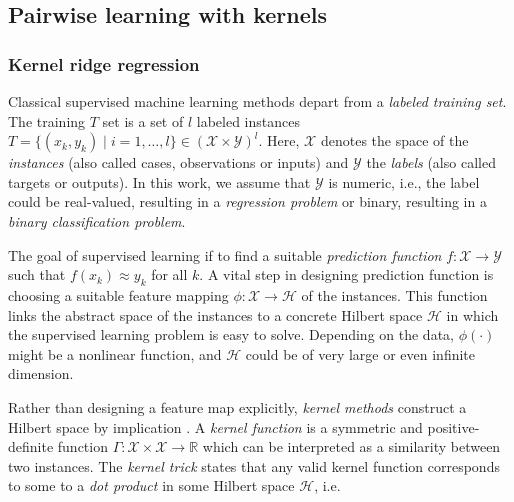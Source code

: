 \documentclass[
]{article}
\begin{document}
\hypertarget{pairwise-learning-with-kernels}{%
\subsection{Pairwise learning with
kernels}\label{pairwise-learning-with-kernels}}

\hypertarget{kernel-ridge-regression}{%
\subsubsection{Kernel ridge regression}\label{kernel-ridge-regression}}

Classical supervised machine learning methods depart from a
\emph{labeled training set}. The training \(T\) set is a set of \(l\)
labeled instances
\(T = \{(x_k, y_k)\mid i=1,\ldots,l\} \in (\mathcal{X}\times \mathcal{Y})^l\).
Here, \(\mathcal{X}\) denotes the space of the \emph{instances} (also
called cases, observations or inputs) and \(\mathcal{Y}\) the
\emph{labels} (also called targets or outputs). In this work, we assume
that \(\mathcal{Y}\) is numeric, i.e., the label could be real-valued,
resulting in a \emph{regression problem} or binary, resulting in a
\emph{binary classification problem}.

The goal of supervised learning if to find a suitable \emph{prediction
function} \(f : \mathcal{X}\rightarrow\mathcal{Y}\) such that
\(f(x_k) \approx y_k\) for all \(k\). A vital step in designing
prediction function is choosing a suitable feature mapping
\(\phi:\mathcal{X}\rightarrow \mathcal{H}\) of the instances. This
function links the abstract space of the instances to a concrete Hilbert
space \(\mathcal{H}\) in which the supervised learning problem is easy
to solve. Depending on the data, \(\phi(\cdot)\) might be a nonlinear
function, and \(\mathcal{H}\) could be of very large or even infinite
dimension.

Rather than designing a feature map explicitly, \emph{kernel methods}
construct a Hilbert space by implication \citep{Scholkopf2002}. A
\emph{kernel function} is a symmetric and positive-definite function
\(\Gamma : \mathcal{X} \times \mathcal{X} \rightarrow \mathbb{R}\) which
can be interpreted as a similarity between two instances. The
\emph{kernel trick} states that any valid kernel function corresponds to
some to a \emph{dot product} in some Hilbert space \(\mathcal{H}\), i.e.
\end{document}
